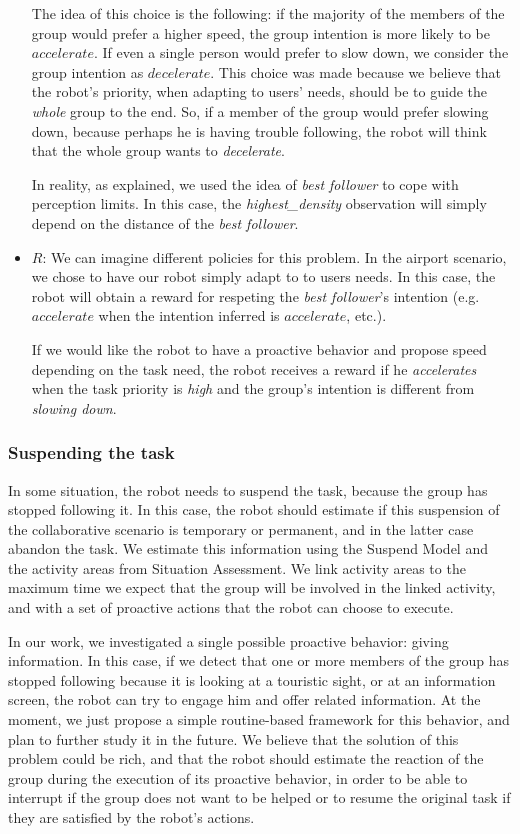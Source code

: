 \begin{itemize}
		The idea of this choice is the following: if the majority of the members of the group would prefer a higher speed, the group intention is more likely to be $accelerate$. If even a single person would prefer to slow down, we consider the group intention as $decelerate$. This choice was made because we believe that the robot's priority, when adapting to users' needs, should be to guide the \textit{whole} group to the end. So, if a member of the group would prefer slowing down, because perhaps he is having trouble following, the robot will think that the whole group wants to \textit{decelerate}.

		In reality, as explained, we used the idea of \textit{best follower} to cope with perception limits. In this case, the \textit{highest\_density} observation will simply depend on the distance of the \textit{best follower}.

	\item  $R$: We can imagine different policies for this problem. In the airport scenario, we chose to have our robot simply adapt to to users needs. In this case, the robot will obtain a reward for respeting the \textit{best follower}'s intention (e.g. $accelerate$ when the intention inferred is $accelerate$, etc.). 

	If we would like the robot to have a proactive behavior and propose speed depending on the task need, the robot receives a reward if he \textit{accelerates} when the task priority is \textit{high} and the group's intention is different from \textit{slowing down}.

\end{itemize}



\subsubsection{Suspending the task}
In some situation, the robot needs to suspend the task, because the group has stopped following it. In this case, the robot should estimate if this suspension of the collaborative scenario is temporary or permanent, and in the latter case abandon the task. We estimate this information using the Suspend Model and the activity areas from Situation Assessment. We link activity areas to the maximum time we expect that the group will be involved in the linked activity, and with a set of proactive actions that the robot can choose to execute.

In our work, we investigated a single possible proactive behavior: giving information. In this case, if we detect that one or more  members
of the group has stopped following because it is looking at a touristic sight, or at an information screen, the robot can try to engage him and offer related information. At the moment, we just propose a simple routine-based framework for this behavior, and plan to further study it in the future. We believe that the solution of this problem could be rich, and that the robot should estimate the reaction of the group during the execution of its proactive behavior, in order to be able to interrupt if the group does not want to be helped or to resume the original task if they are satisfied by the robot's actions.


